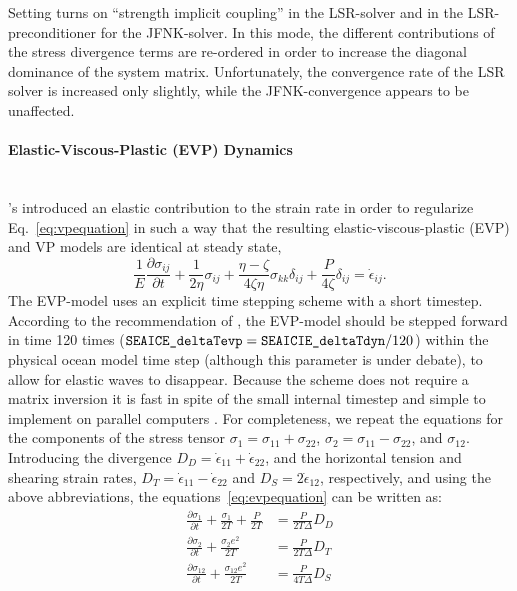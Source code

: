 Setting  turns on ``strength
implicit coupling'' \citep{hutchings04} in the LSR-solver and in the
LSR-preconditioner for the JFNK-solver. In this mode, the different
contributions of the stress divergence terms are re-ordered in order
to increase the diagonal dominance of the system
matrix. Unfortunately, the convergence rate of the LSR solver is
increased only slightly, while the JFNK-convergence appears to be
unaffected.

\paragraph{Elastic-Viscous-Plastic (EVP) Dynamics\label{sec:pkg:seaice:EVPdynamics}}~\\
%
\citet{hun97}'s introduced an elastic contribution to the strain
rate in order to regularize Eq.~\ref{eq:vpequation} in such a way that
the resulting elastic-viscous-plastic (EVP) and VP models are
identical at steady state,
\begin{equation}
  \label{eq:evpequation}
  \frac{1}{E}\frac{\partial\sigma_{ij}}{\partial{t}} +
  \frac{1}{2\eta}\sigma_{ij} 
  + \frac{\eta - \zeta}{4\zeta\eta}\sigma_{kk}\delta_{ij}  
  + \frac{P}{4\zeta}\delta_{ij}
  = \dot{\epsilon}_{ij}. 
\end{equation}
The EVP-model uses an explicit time stepping scheme with a short
timestep. According to the recommendation of \citet{hun97}, the
EVP-model should be stepped forward in time 120 times
($\texttt{SEAICE\_deltaTevp} = \texttt{SEAICIE\_deltaTdyn}/120$) within
the physical ocean model time step (although this parameter is under
debate), to allow for elastic waves to disappear.  Because the scheme
does not require a matrix inversion it is fast in spite of the small
internal timestep and simple to implement on parallel computers
\citep{hun97}. For completeness, we repeat the equations for the
components of the stress tensor $\sigma_{1} =
\sigma_{11}+\sigma_{22}$, $\sigma_{2}= \sigma_{11}-\sigma_{22}$, and
$\sigma_{12}$. Introducing the divergence $D_D =
\dot{\epsilon}_{11}+\dot{\epsilon}_{22}$, and the horizontal tension
and shearing strain rates, $D_T =
\dot{\epsilon}_{11}-\dot{\epsilon}_{22}$ and $D_S =
2\dot{\epsilon}_{12}$, respectively, and using the above
abbreviations, the equations~\ref{eq:evpequation} can be written as:
\begin{align}
  \label{eq:evpstresstensor1}
  \frac{\partial\sigma_{1}}{\partial{t}} + \frac{\sigma_{1}}{2T} +
  \frac{P}{2T} &= \frac{P}{2T\Delta} D_D \\
  \label{eq:evpstresstensor2}
  \frac{\partial\sigma_{2}}{\partial{t}} + \frac{\sigma_{2} e^{2}}{2T}
  &= \frac{P}{2T\Delta} D_T \\
  \label{eq:evpstresstensor12}
  \frac{\partial\sigma_{12}}{\partial{t}} + \frac{\sigma_{12} e^{2}}{2T}
  &= \frac{P}{4T\Delta} D_S 
\end{align}
